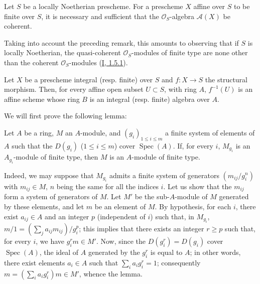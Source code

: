 \begin{proposition}[6.1.3]
\label{II.6.1.3}
Let $S$ be a locally Noetherian prescheme. For a prescheme $X$ affine over
$S$ to be finite over $S$, it is necessary and sufficient that the
$\mathcal{O}_S$-algebra $\mathcal{A}(X)$ be coherent.
\end{proposition}

Taking into account the preceding remark, this amounts to observing that if
$S$ is locally Noetherian, the quasi-coherent $\mathcal{O}_S$-modules of
finite type are none other than the coherent $\mathcal{O}_S$-modules
(\hyperref[I.1.5.1]{I, 1.5.1}).

\begin{proposition}[6.1.4]
\label{II.6.1.4}
Let $X$ be a prescheme integral (resp. finite) over $S$ and $f:X\to S$ the
structural morphism. Then, for every affine open subset $U\subset S$, with
ring $A$, $f^{-1}(U)$ is an affine scheme whose ring $B$ is an integral
(resp. finite) algebra over $A$.
\end{proposition}


We will first prove the following lemma:

\begin{lemma}[6.1.4.1]
\label{II.6.1.4.1}
Let $A$ be a ring, $M$ an $A$-module, and $(g_i)_{1\leq i\leq m}$ a finite
system of elements of $A$ such that the $D(g_i)$ ($1\leq i\leq m$) cover
$\operatorname{Spec}(A)$. If, for every $i$, $M_{g_i}$ is an
$A_{g_i}$-module of finite type, then $M$ is an $A$-module of finite type.
\end{lemma}

Indeed, we may suppose that $M_{g_i}$ admits a finite system of generators
$(m_{ij}/g_i^n)$ with $m_{ij}\in M$, $n$ being the same for all the indices
$i$. Let us show that the $m_{ij}$ form a system of generators of $M$. Let
$M'$ be the sub-$A$-module of $M$ generated by these elements, and let $m$ be
an element of $M$. By hypothesis, for each $i$, there exist $a_{ij}\in A$ and
an integer $p$ (independent of $i$) such that, in $M_{g_i}$,
$m/1=(\sum_j a_{ij}m_{ij})/g_i^p$; this implies that there exists an integer
$r\geq p$ such that, for every $i$, we have $g_i^r m\in M'$. Now, since the
$D(g_i^r)=D(g_i)$ cover $\operatorname{Spec}(A)$, the ideal of $A$
generated by the $g_i^r$ is equal to $A$; in other words, there exist
elements $a_i\in A$ such that $\sum_i a_i g_i^r=1$; consequently
$m=(\sum_i a_i g_i^r)m\in M'$, whence the lemma.

